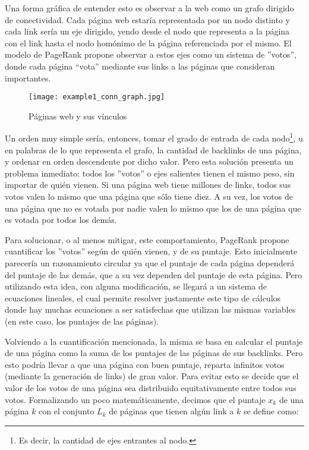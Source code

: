 \par Una forma gr\'afica de entender esto es observar a la web como un grafo
dirigido de conectividad. Cada p\'agina web estar\'ia representada por un nodo
distinto y cada link ser\'ia un eje dirigido, yendo desde el nodo que
representa a la p\'agina con el link hasta el nodo hom\'onimo de la p\'agina
referenciada por el mismo. El modelo de PageRank propone observar a estos ejes
como un sistema de ''votos'', donde cada p\'agina ``vota'' mediante sus links a las
p\'aginas que consideran importantes.

\begin{wrapfigure}[22]{r}{0.52\textwidth}
    \texttt{[image: example1\_conn\_graph.jpg]}
    \caption{P\'aginas web y sus v\'inculos~\cite{uchicago_research}}
\end{wrapfigure}
\noindent

\par Un orden muy simple ser\'ia, entonces, tomar el grado de entrada de cada
nodo\footnote{Es decir, la cantidad de ejes entrantes al nodo.}, u en palabras
de lo que representa el grafo, la cantidad de backlinks de una p\'agina, y
ordenar en orden descendente por dicho valor. Pero esta soluci\'on presenta
un problema inmediato: todos los ''votos'' o ejes salientes tienen el mismo
peso, sin importar de qui\'en vienen. Si una p\'agina web tiene millones de
links, todos sus votos valen lo mismo que una p\'agina que s\'olo tiene diez. A
su vez, los votos de una p\'agina que no es votada por nadie valen lo mismo que
los de una p\'agina que es votada por todos los dem\'as.

\par Para solucionar, o al menos mitigar, este comportamiento, PageRank propone
cuantificar los ''votos'' seg\'un de quién vienen, y de su puntaje. Esto
inicialmente parecer\'ia un razonamiento circular ya que el puntaje de cada
p\'agina depender\'a del puntaje de las dem\'as, que a su vez dependen del
puntaje de esta p\'agina. Pero utilizando esta idea, con alguna modificaci\'on,
se llegar\'a a un sistema de ecuaciones lineales, el cual permite
resolver justamente este tipo de c\'alculos donde hay muchas ecuaciones a ser
satisfechas que utilizan las mismas variables (en este caso, los puntajes de las
p\'aginas).

\par Volviendo a la cuantificaci\'on mencionada, la misma se basa en calcular el
puntaje de una p\'agina como la suma de los puntajes de las p\'aginas de sus
backlinks. Pero esto podr\'ia llevar a que una p\'agina con buen puntaje,
reparta infinitos votos (mediante la generaci\'on de links) de gran valor. Para
evitar esto se decide que el valor de los votos de una p\'agina sea distribuido
equitativamente entre todos sus votos. Formalizando un poco matem\'aticamente,
decimos que el puntaje $x_k$ de una p\'agina $k$ con el conjunto $L_k$ de
p\'aginas que tienen alg\'un link a $k$ se define como:

